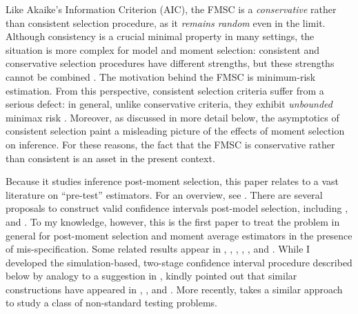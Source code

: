 Like Akaike's Information Criterion (AIC), the FMSC is a \emph{conservative} rather than consistent selection procedure, as it \emph{remains random} even in the limit.	
Although consistency is a crucial minimal property in many settings, the situation is more complex for model and moment selection: consistent and conservative selection procedures have different strengths, but these strengths cannot be combined \citep{Yang2005}.
The motivation behind the FMSC is minimum-risk estimation.
From this perspective, consistent selection criteria suffer from a serious defect: in general, unlike conservative criteria, they exhibit \emph{unbounded} minimax risk \citep{LeebPoetscher2008}.
Moreover, as discussed in more detail below, the asymptotics of consistent selection paint a misleading picture of the effects of moment selection on inference.
For these reasons, the fact that the FMSC is conservative rather than consistent is an asset in the present context.

Because it studies inference post-moment selection, this paper relates to a vast literature on ``pre-test'' estimators.
For an overview, see \citet{LeebPoetscher2005, LeebPoetscher2009}.
There are several proposals to construct valid confidence intervals post-model selection, including \cite{Kabaila1998}, \cite{HjortClaeskens} and \cite{KabailaLeeb2006}. 
To my knowledge, however, this is the first paper to treat the problem in general for post-moment selection and moment average estimators in the presence of mis-specification.
Some related results appear in \cite{Berkowitz2008}, \cite{Berkowitz2012}, \cite{Guggenberger2010}, \cite{Guggenberger2012}, \cite{GuggenbergerKumar}, and \cite{Caner2014}.
While I developed the simulation-based, two-stage confidence interval procedure described below by analogy to a suggestion in \cite{ClaeskensHjortbook}, \cite{Leeb} kindly pointed out that similar constructions have appeared in \cite{Loh1985}, \cite{Berger1994}, and \cite{Silvapulle1996}. More recently, \cite{McCloskey} takes a similar approach to study a class of non-standard testing problems.

